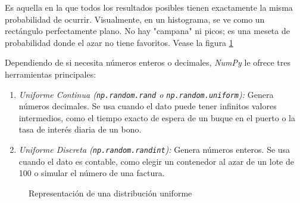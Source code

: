 Es aquella en la que todos los resultados posibles tienen exactamente la misma probabilidad de ocurrir. Visualmente, en un histograma, se ve como un rectángulo perfectamente plano. No hay "campana" ni picos; es una meseta de probabilidad donde el azar no tiene favoritos. Vease la figura \ref{distribución_uniforme_numpy}

Dependiendo de si necesita números enteros o decimales, \textit{NumPy} le ofrece tres herramientas principales:

\begin{enumerate}
\item \textit{Uniforme Continua (\texttt{np.random.rand} o \texttt{np.random.uniform}):} Genera números decimales. Se usa cuando el dato puede tener infinitos valores intermedios, como el tiempo exacto de espera de un buque en el puerto o la tasa de interés diaria de un bono.
\item \textit{Uniforme Discreta (\texttt{np.random.randint}):} Genera números enteros. Se usa cuando el dato es contable, como elegir un contenedor al azar de un lote de 100 o simular el número de una factura.
\end{enumerate}


\begin{figure}[!ht]
\centering
{}
\caption{Representación de una distribución uniforme}
\label{distribución_uniforme_numpy}
\end{figure}

